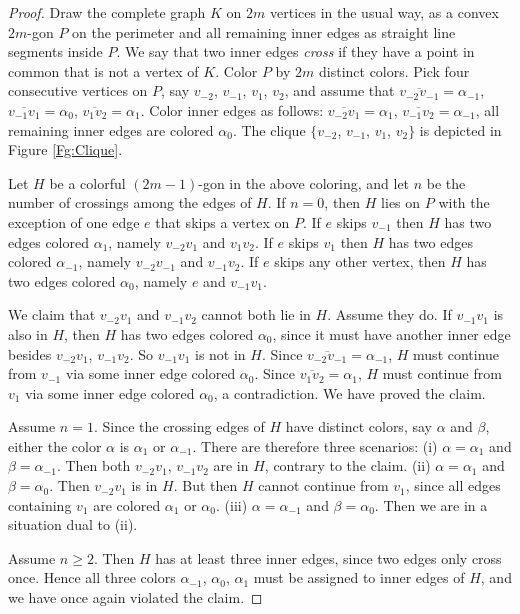 \documentclass[12pt]{amsart}
\theoremstyle{plain}
\numberwithin{equation}{section}
\begin{document}
\begin{proof}
Draw the complete graph $K$ on $2m$ vertices in the usual way, as a convex
$2m$-gon $P$ on the perimeter and all remaining inner edges as straight line
segments inside $P$. We say that two inner edges \emph{cross} if they have a
point in common that is not a vertex of $K$. Color $P$ by $2m$ distinct colors.
Pick four consecutive vertices on $P$, say $v_{-2}$, $v_{-1}$, $v_{1}$,
$v_{2}$, and assume that $\overline{v_{-2}v_{-1}}=\alpha_{-1}$,
$\overline{v_{-1}v_{1}}=\alpha_{0}$, $\overline{v_{1}v_{2}}=\alpha_{1}$. Color
inner edges as follows: $\overline{v_{-2}v_{1}}=\alpha_{1}$, $\overline
{v_{-1}v_{2}}=\alpha_{-1}$, all remaining inner edges are colored $\alpha_{0}$.
The clique $\{v_{-2}$, $v_{-1}$, $v_{1}$, $v_{2}\}$ is depicted in Figure
\ref{Fg:Clique}.

Let $H$ be a colorful $(2m-1)$-gon in the above coloring, and let $n$ be the
number of crossings among the edges of $H$. If $n=0$, then $H$ lies on $P$ with
the exception of one edge $e$ that skips a vertex on $P$. If $e$ skips $v_{-1}$
then $H$ has two edges colored $\alpha_{1}$, namely $v_{-2}v_{1}$ and
$v_{1}v_{2}$. If $e$ skips $v_{1}$ then $H$ has two edges colored $\alpha
_{-1}$, namely $v_{-2}v_{-1}$ and $v_{-1}v_{2}$. If $e$ skips any other vertex,
then $H$ has two edges colored $\alpha_{0}$, namely $e$ and $v_{-1}v_{1}$.

We claim that $v_{-2}v_{1}$ and $v_{-1}v_{2}$ cannot both lie in $H$. Assume
they do. If $v_{-1}v_{1}$ is also in $H$, then $H$ has two edges colored
$\alpha_{0}$, since it must have another inner edge besides $v_{-2}v_{1}$,
$v_{-1}v_{2}$. So $v_{-1}v_{1}$ is not in $H$. Since
$\overline{v_{-2}v_{-1}}=\alpha_{-1}$, $H$ must continue from $v_{-1}$ via some
inner edge colored $\alpha_{0}$. Since $\overline{v_{1}v_{2}}=\alpha_{1}$, $H$
must continue from $v_{1}$ via some inner edge colored $\alpha_{0}$, a
contradiction. We have proved the claim.

Assume $n=1$. Since the crossing edges of $H$ have distinct colors, say
$\alpha$ and $\beta$, either the color $\alpha$ is $\alpha_{1}$ or
$\alpha_{-1}$. There are therefore three scenarios: (i) $\alpha=\alpha_{1}$
and $\beta=\alpha_{-1}$. Then both $v_{-2}v_{1}$, $v_{-1}v_{2}$ are in $H$,
contrary to the claim. (ii) $\alpha=\alpha_{1}$ and $\beta=\alpha_{0}$. Then
$v_{-2}v_{1}$ is in $H$. But then $H$ cannot continue from $v_{1}$, since all
edges containing $v_{1}$ are colored $\alpha_{1}$ or $\alpha_{0}$. (iii)
$\alpha=\alpha_{-1}$ and $\beta=\alpha_{0}$. Then we are in a situation dual
to (ii).

Assume $n\ge 2$. Then $H$ has at least three inner edges, since two
edges only cross once. Hence all three colors $\alpha_{-1}$, $\alpha_{0}$,
$\alpha_{1}$ must be assigned to inner edges of $H$, and we have once again
violated the claim.
\end{proof}
\end{document}
